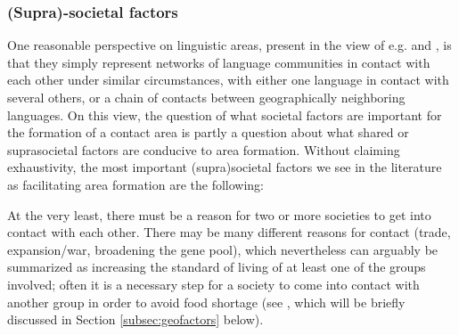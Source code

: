 \documentclass[output=paper]{langscibook}
\begin{document}
\subsubsection{(Supra)-societal factors} \label{subsec:societal}

One reasonable perspective on linguistic areas, present in the view of e.g. \textcite{Campbell2006Linguistic} and \textcite{Matras2011Explaining},  is that they simply represent networks of language communities in contact with each other under similar circumstances, with either one language in contact with several others, or a chain of contacts between geo\-graphically neighboring languages. On this view, the question of what societal factors are important for the formation of a contact area is partly a question about what shared or suprasocietal factors are conducive to area formation. Without claiming exhaustivity, the most important (supra)societal factors we see in the literature as facilitating area formation are the following:


At the very least, there must be a reason for two or more societies to get into contact with each other. There may be many different reasons for contact (trade, expansion/war, broadening the gene pool), which nevertheless can arguably be summarized as increasing the standard of living of at least one of the groups involved; often it is a necessary step for a society to come into contact with another group in order to avoid food shortage (see \cite{nettle1999linguistic}, which will be briefly discussed in Section \ref{subsec:geofactors} below).

\end{document}
